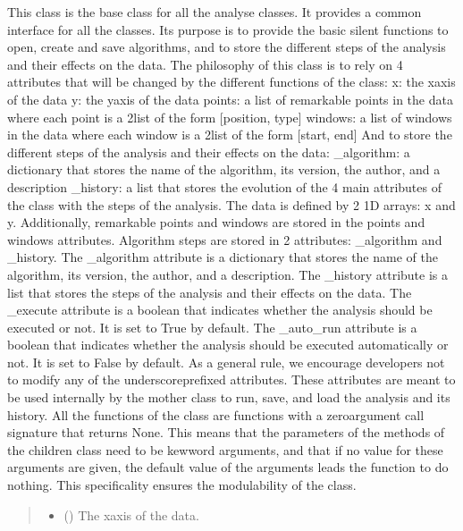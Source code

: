 \documentclass[letterpaper,10pt,english]{sphinxmanual}
\begin{document}
\begin{fulllineitems}
\sphinxAtStartPar
This class is the base class for all the analyse classes. It provides a common interface for all the classes. Its purpose is to provide the basic silent functions to open, create and save algorithms, and to store the different steps of the analysis and their effects on the data.
The philosophy of this class is to rely on 4 attributes that will be changed by the different functions of the class:
\sphinxhyphen{} x: the x\sphinxhyphen{}axis of the data
\sphinxhyphen{} y: the y\sphinxhyphen{}axis of the data
\sphinxhyphen{} points: a list of remarkable points in the data where each point is a 2\sphinxhyphen{}list of the form {[}position, type{]}
\sphinxhyphen{} windows: a list of windows in the data where each window is a 2\sphinxhyphen{}list of the form {[}start, end{]}
And to store the different steps of the analysis and their effects on the data:
\sphinxhyphen{} \_algorithm: a dictionary that stores the name of the algorithm, its version, the author, and a description
\sphinxhyphen{} \_history: a list that stores the evolution of the 4 main attributes of the class with the steps of the analysis.
The data is defined by 2 1\sphinxhyphen{}D arrays: x and y. Additionally, remarkable points and windows are stored in the points and windows attributes.
Algorithm steps are stored in 2 attributes: \_algorithm and \_history. The \_algorithm attribute is a dictionary that stores the name of the algorithm, its version, the author, and a description. The \_history attribute is a list that stores the steps of the analysis and their effects on the data.
The \_execute attribute is a boolean that indicates whether the analysis should be executed or not. It is set to True by default. The \_auto\_run attribute is a boolean that indicates whether the analysis should be executed automatically or not. It is set to False by default.
As a general rule, we encourage developers not to modify any of the underscore\sphinxhyphen{}prefixed attributes. These attributes are meant to be used internally by the mother class to run, save, and load the analysis and its history.
All the functions of the class are functions with a zero\sphinxhyphen{}argument call signature that returns None. This means that the parameters of the methods of the children class need to be kew\sphinxhyphen{}word arguments, and that if no value for these arguments are given, the default value of the arguments leads the function to do nothing. This specificality ensures the modulability of the class.
\begin{quote}\begin{description}
\begin{itemize}
\item {} 
\sphinxAtStartPar
{} () \textendash{} The x\sphinxhyphen{}axis of the data.


\end{itemize}
\end{description}
\end{quote}
\end{fulllineitems}
\end{document}
